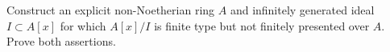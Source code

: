 \begin{problem}\label{chal:vi26-02}
Construct an explicit non-Noetherian ring $A$ and infinitely generated ideal $I\subset A[x]$ for which $A[x]/I$ is finite type but not finitely presented over $A$.  Prove both assertions.
\end{problem}
